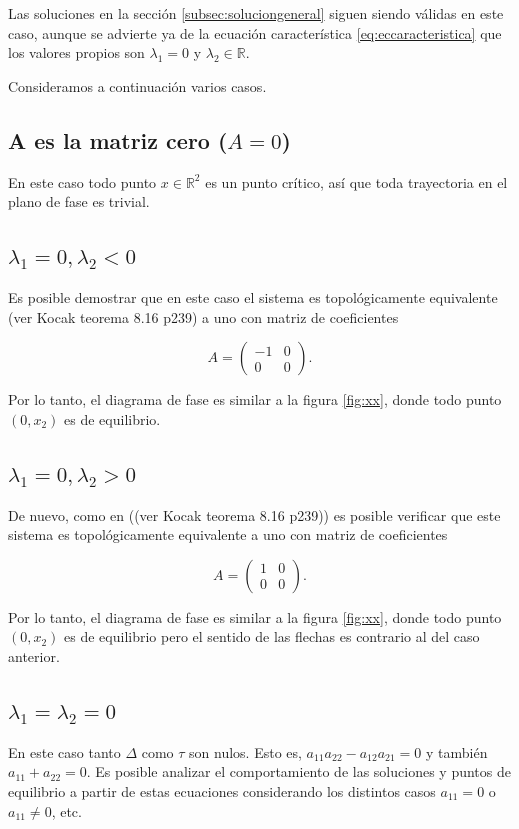 \documentclass[11pt]{book}
\theoremstyle{definition}
\numberwithin{definition}{section}
\theoremstyle{theorem}
\numberwithin{theorem}{section}
\numberwithin{lemma}{section}
\numberwithin{corollary}{section}
\theoremstyle{plain}
\numberwithin{example}{section}
\newcommand{\R}{{\ensuremath{\mathbb{R}}}}
\begin{document}
Las soluciones en la sección \ref{subsec:soluciongeneral} siguen siendo válidas en este caso, aunque se advierte ya de la ecuación característica \ref{eq:eccaracteristica} que los valores propios son $\lambda_1 = 0$ y $\lambda_2 \in \R$.

Consideramos a continuación varios casos.

\subsection{A es la matriz cero ($A = 0$)}
En este caso todo punto $x \in \R^2$ es un punto crítico, así que toda trayectoria en el plano de fase es trivial.

\subsection{$\lambda_1 = 0, \lambda_2 < 0$}
Es posible demostrar que en este caso el sistema es topológicamente equivalente (ver Kocak teorema 8.16 p239) a uno con matriz de coeficientes

$$ A = \left( \begin{array}{ll} -1 & 0 \\ 0 & 0 \end{array} \right).$$

Por lo tanto, el diagrama de fase es similar a la figura \ref{fig:xx}, donde todo punto $(0,x_2)$ es de equilibrio.

\subsection{$\lambda_1 = 0, \lambda_2 > 0$}
De nuevo, como en ((ver Kocak teorema 8.16 p239)) es posible verificar que este sistema es topológicamente equivalente a uno con matriz de coeficientes

$$ A = \left( \begin{array}{ll} 1 & 0 \\ 0 & 0 \end{array} \right).$$

Por lo tanto, el diagrama de fase es similar a la figura \ref{fig:xx}, donde todo punto $(0,x_2)$ es de equilibrio pero el sentido de las flechas es contrario al del caso anterior.

\subsection{$\lambda_1 = \lambda_2 = 0$}
En este caso tanto $\Delta$ como $\tau$ son nulos. Esto es, $a_{11}a_{22} - a_{12}a_{21} = 0$ y también $a_{11} + a_{22} = 0$.
Es posible analizar el comportamiento de las soluciones y puntos de equilibrio a partir de estas ecuaciones considerando los distintos casos $a_{11} = 0$ o $a_{11} \neq 0$, etc.
\end{document}
